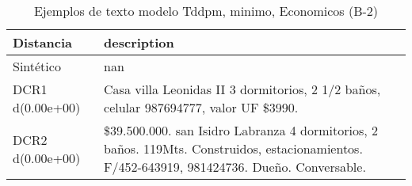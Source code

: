 \begin{table}[H]
\centering
\fontsize{10}{14}\selectfont
\caption{Ejemplos de texto modelo Tddpm, minimo, Economicos (B-2)}
\label{table-example-economicos-b-2-tddpm_mlp-min-text}
\begin{tabular}{|l|m{35em}|}
\hline
\rowcolor[gray]{0.8}
Distancia & description \\
\hline Sintético & nan \\
\hline DCR1 d(0.00e+00) & Casa villa Leonidas II 3 dormitorios, 2 1/2 ba\~nos, celular 987694777, valor UF \$3990. \\
\hline DCR2 d(0.00e+00) & \$39.500.000. san Isidro Labranza 4 dormitorios, 2 ba\~nos. 119Mts. Construidos, estacionamientos. F/452-643919, 981424736. Due\~no. Conversable. \\
\hline
\end{tabular}
\end{table}
